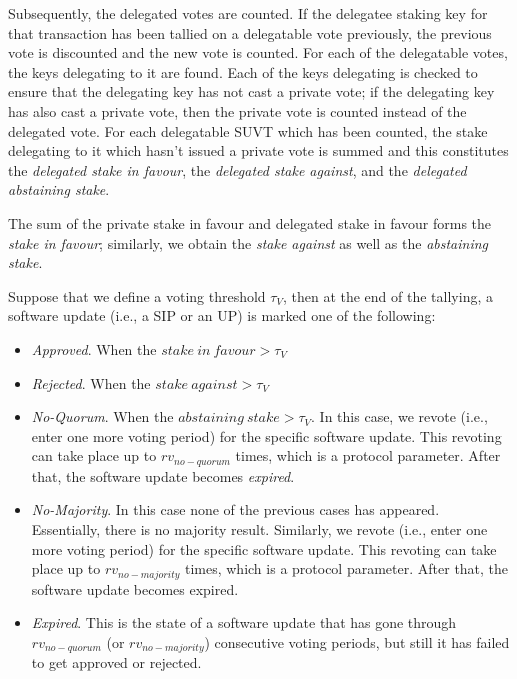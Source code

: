 Subsequently, the delegated votes are counted. %
If the delegatee staking key for that transaction has been tallied on a delegatable vote previously, the previous vote is discounted and the new vote is counted. For each of the delegatable votes, the keys delegating to it are found. Each of the keys delegating is checked to ensure that the delegating key has not cast a private vote; if the delegating key has also cast a private vote, then the private vote is counted instead of the delegated vote. For each delegatable SUVT which has been counted, the stake delegating to it which hasn't issued a private vote is summed and this constitutes the \emph{delegated stake in favour}, the \emph{delegated stake against}, and the \emph{delegated abstaining stake}.

The sum of the private stake in favour and delegated stake in favour forms the \emph{stake in favour}; similarly, we obtain the \emph{stake against} as well as the \emph{abstaining stake}.

Suppose that we define a voting threshold $\tau_V$, then at the end of the tallying, a software update (i.e., a SIP or an UP) is marked one of the following:
\begin{itemize}

\item \emph{Approved}. When the $stake\ in\ favour > \tau_V$

\item \emph{Rejected}. When the $stake\ against > \tau_V$

\item \emph{No-Quorum}. When the $abstaining\ stake > \tau_V$. In this case, we revote (i.e., enter one more voting period) for the specific software update. This revoting can take place up to $rv_{no-quorum}$ times, which is a protocol parameter. After that, the software update becomes \emph{expired}.

\item \emph{No-Majority}. In this case none of the previous cases has appeared. Essentially, there is no majority result. Similarly, we revote (i.e., enter one more voting period) for the specific software update. This revoting can take place up to $rv_{no-majority}$ times, which is a protocol parameter. After that, the software update becomes expired.

\item \emph{Expired}. This is the state of a software update that has gone through $rv_{no-quorum}$ (or $rv_{no-majority}$) consecutive voting periods, but still it has failed to get approved or rejected.
\end{itemize}

